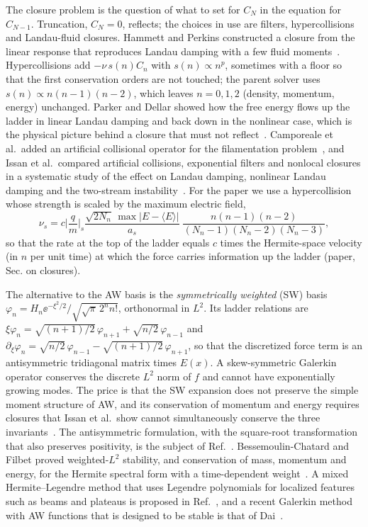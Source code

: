 The closure problem is the question of what to set for $C_N$ in the equation for $C_{N-1}$. Truncation, $C_N=0$, reflects; the choices in use are filters, hypercollisions and Landau-fluid closures. Hammett and Perkins constructed a closure from the linear response that reproduces Landau damping with a few fluid moments~\citep{HammettPerkins1990}. Hypercollisions add $-\nu\,s(n)C_n$ with $s(n)\propto n^p$, sometimes with a floor so that the first conservation orders are not touched; the parent solver uses $s(n)\propto n(n-1)(n-2)$, which leaves $n=0,1,2$ (density, momentum, energy) unchanged. Parker and Dellar showed how the free energy flows up the ladder in linear Landau damping and back down in the nonlinear case, which is the physical picture behind a closure that must not reflect~\citep{ParkerDellar2015}. Camporeale et al.\ added an artificial collisional operator for the filamentation problem~\citep{Camporeale2016}, and Issan et al.\ compared artificial collisions, exponential filters and nonlocal closures in a systematic study of the effect on Landau damping, nonlinear Landau damping and the two-stream instability~\citep{Issan2025}. For the paper we use a hypercollision whose strength is scaled by the maximum electric field,
\begin{equation}
\nu_s=c\Big|\frac{q}{m}\Big|_s\frac{\sqrt{2N_n}\,\max|E-\langle E\rangle|}{a_s}\;\frac{n(n-1)(n-2)}{(N_n-1)(N_n-2)(N_n-3)},
\end{equation}
so that the rate at the top of the ladder equals $c$ times the Hermite-space velocity (in $n$ per unit time) at which the force carries information up the ladder (paper, Sec. on closures).

The alternative to the AW basis is the \emph{symmetrically weighted} (SW) basis $\varphi_n=H_n\ee^{-\xi^2/2}/\sqrt{\sqrt\pi\,2^nn!}$, orthonormal in $L^2$. Its ladder relations are $\xi\varphi_n=\sqrt{(n+1)/2}\,\varphi_{n+1}+\sqrt{n/2}\,\varphi_{n-1}$ and $\partial_\xi\varphi_n=\sqrt{n/2}\,\varphi_{n-1}-\sqrt{(n+1)/2}\,\varphi_{n+1}$, so that the discretized force term is an antisymmetric tridiagonal matrix times $E(x)$. A skew-symmetric Galerkin operator conserves the discrete $L^2$ norm of $f$ and cannot have exponentially growing modes. The price is that the SW expansion does not preserve the simple moment structure of AW, and its conservation of momentum and energy requires closures that Issan et al.\ show cannot simultaneously conserve the three invariants~\citep{Issan2024b}. The antisymmetric formulation, with the square-root transformation that also preserves positivity, is the subject of Ref.~\citep{Issan2024a}. Bessemoulin-Chatard and Filbet proved weighted-$L^2$ stability, and conservation of mass, momentum and energy, for the Hermite spectral form with a time-dependent weight~\citep{BessemoulinChatardFilbet2021}. A mixed Hermite--Legendre method that uses Legendre polynomials for localized features such as beams and plateaus is proposed in Ref.~\citep{Issan2026}, and a recent Galerkin method with AW functions that is designed to be stable is that of Dai~\citep{Dai2026}.


